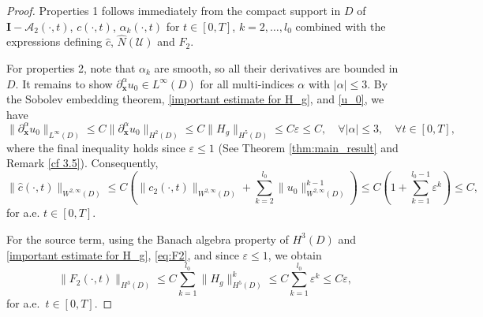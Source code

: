 \documentclass[10pt,a4paper]{amsart}
\begin{document}
	\begin{proof}
		Properties 1 follows immediately from the compact support in $D$ of $\mathbf{I} - \mathscr{A}_2(\cdot, t)$, $c(\cdot, t)$, $\alpha_k(\cdot, t)$ for $t \in [0, T]$, $k = 2, \dots, l_0$ combined with the expressions defining $\hat{c}$, $\hat{N}(\mathscr{U})$ and $F_2$.
		
		For properties 2, note that $\alpha_k$ are smooth, so all their derivatives are bounded in $D$. It remains to show $\partial_{\mathbf{x}}^{\alpha} u_0 \in L^{\infty}(D)$ for all multi-indices $\alpha$ with $|\alpha| \leqslant 3$. By the Sobolev embedding theorem, \eqref{important estimate for H_g}, and \eqref{u_0}, we have
		\begin{equation}\label{5.2}
			\|\partial_{\mathbf{x}}^{\alpha} u_0\|_{L^{\infty}(D)} \leqslant C \|\partial_{\mathbf{x}}^{\alpha} u_0\|_{H^{2}(D)} \leqslant C \|H_g\|_{H^5(D)} \leqslant C \varepsilon \leqslant C, \quad \forall |\alpha| \leqslant 3, \quad \forall t \in [0, T],
		\end{equation}
		where the final inequality holds since $\varepsilon \leqslant 1$ (See Theorem \ref{thm:main_result} and Remark \ref{cf 3.5}). Consequently,
		\begin{equation*}
			\|\hat{c}(\cdot, t)\|_{W^{2,\infty}(D)}\leqslant  C \left( \|c_2(\cdot, t)\|_{W^{2,\infty}(D)} + \sum_{k=2}^{l_0} \|u_0\|_{W^{2,\infty}(D)}^{k-1} \right) \leqslant C \left( 1 + \sum_{k=1}^{l_0-1} \varepsilon^{k} \right) \leqslant C,
		\end{equation*}
		for a.e. $t \in [0, T]$.
		
		For the source term, using the Banach algebra property of $H^3(D)$ and
	\eqref{important estimate for H_g}, \eqref{eq:F2}, and since $\varepsilon\le1$,
	we obtain
	\begin{equation}\label{eq:F2_est}
		\|F_2(\cdot,t)\|_{H^3(D)} \le C\sum_{k=1}^{l_0}\|H_g\|_{H^5(D)}^k
		\le C\sum_{k=1}^{l_0}\varepsilon^k \le C\varepsilon,
	\end{equation}
	for a.e.\ $t\in[0,T]$.
	\end{proof}
\end{document}

